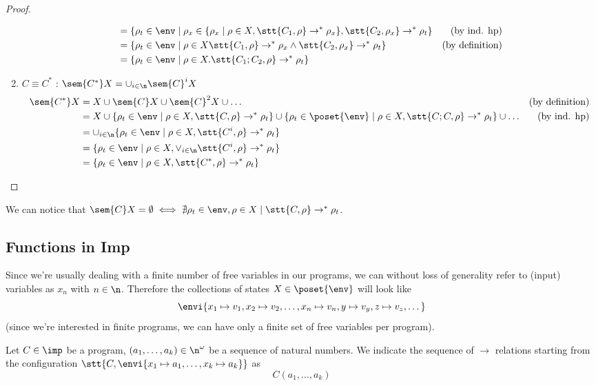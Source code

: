 \begin{proof}
\begin{enumerate}
\begin{align*}
      & = \{\rho_t \in\env \mid \rho_x \in \{\rho_x \mid \rho \in X, \stt{C_1, \rho}  \to^* \rho_x\}, \stt{C_2, \rho_x} \to^* \rho_t\} & \text{(by ind. hp)}\\
      & = \{\rho_t \in\env \mid \rho \in X \stt{C_1, \rho} \to^* \rho_x \wedge \stt{C_2, \rho_x} \to^* \rho_t\} & \text{(by definition)}\\
      & = \{\rho_t \in\env \mid \rho \in X . \stt{C_1;C_2, \rho} \to^* \rho_t\}
    \end{align*}
  \item \(C \equiv C^*\) : \(\sem{C^*}X = \cup_{i\in\n}\sem{C}^i X\)
    \begin{align*}
      \sem{C^*}X & = X \cup \sem{C}X \cup \sem{C}^2X \cup \dots & \text{(by definition)}\\
      & = X \cup \{\rho_t \in\env \mid \rho \in X, \stt{C,\rho} \to^* \rho_t\} \cup \{\rho_t \in\poset{\env} \mid \rho \in X, \stt{C;C,\rho} \to^* \rho_t\} \cup \dots & \text{(by ind. hp)}\\
      & = \cup_{i\in\n} \{\rho_t \in\env \mid \rho \in X, \stt{C^i, \rho} \to^*  \rho_t\} \\
      & = \{\rho_t \in\env \mid \rho \in X, \vee_{i\in\n} \stt{C^i, \rho} \to^* \rho_t\} \\
      & = \{\rho_t \in\env \mid \rho \in X, \stt{C^*, \rho} \to^* \rho_t\}
    \end{align*}
  \end{enumerate}
\end{proof}

We can notice that \(\sem{C}X = \emptyset \iff \nexists \rho_t\in\env,
\rho \in X \mid \stt{C,\rho} \to^* \rho_t\).

\subsection{Functions in Imp}

Since we're usually dealing with a finite number of free variables in
our programs, we can without loss of generality refer to (input)
variables as \(x_n\) with \(n\in\n\). Therefore the collections of
states \(X\in\poset{\env}\) will look like \[\envi{x_1\mapsto v_1, x_2
  \mapsto v_2, \dots, x_n\mapsto v_n, y \mapsto v_y, z \mapsto v_z,
  \dots}\] (since we're interested in finite programs, we can have
only a finite set of free variables per program).

\begin{notation}
  Let \(C\in\imp\) be a program, \((a_1, \dots, a_k) \in \n^\omega\)
  be a sequence of natural numbers. We indicate the sequence of
  \(\to\) relations starting from the configuration
  \(\stt{C,\envi{x_1\mapsto a_1, \dots, x_k\mapsto a_k}}\) as \[C(a_1,
  \dots, a_k)\]
\end{notation}

